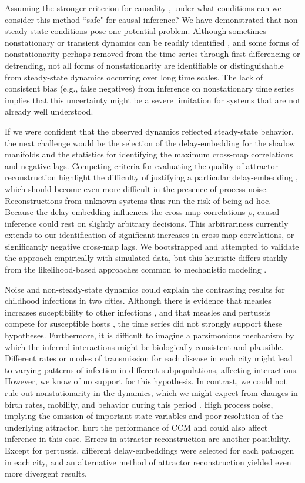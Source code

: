 \documentclass[10pt]{article}
\begin{document}
Assuming the stronger criterion for causality \cite{Ye2015}, under what conditions can we consider this method ``safe" for causal inference?
We have demonstrated that non-steady-state conditions pose one potential problem.
Although sometimes nonstationary or transient dynamics can be readily identified \cite{Ives2012}, and some forms of nonstationarity perhaps removed from the time series through first-differencing or detrending, not all forms of nonstationarity are identifiable or distinguishable from steady-state dynamics occurring over long time scales.
The lack of consistent bias (e.g., false negatives) from inference on nonstationary time series implies that this uncertainty might be a severe limitation for systems that are not already well understood.

If we were confident that the observed dynamics reflected steady-state behavior, the next challenge would be the selection of the delay-embedding for the shadow manifolds and the statistics for identifying the maximum cross-map correlations and negative lags.
Competing criteria for evaluating the quality of attractor reconstruction highlight the difficulty of justifying a particular delay-embedding \cite{Casdagli1991, Uzal2011, Nichkawde2013, Tajima2015, Sugihara1990}, which should become even more difficult in the presence of process noise.
Reconstructions from unknown systems thus run the risk of being ad hoc.
Because the delay-embedding influences the cross-map correlations $\rho$, causal inference could rest on slightly arbitrary decisions.   
This arbitrariness currently extends to our identification of significant increases in cross-map correlations, or significantly negative cross-map lags.
We bootstrapped and attempted to validate the approach empirically with simulated data, but this heuristic differs starkly from the likelihood-based approaches common to mechanistic modeling \cite{HilbornMangel}.

Noise and non-steady-state dynamics could explain the contrasting results for childhood infections in two cities. 
Although there is evidence that measles increases suceptibility to other infections \cite{Mina2015}, and that measles and pertussis compete for susceptible hosts \cite{Rohani2003}, the time series did not strongly support these hypotheses. 
Furthermore, it is difficult to imagine a parsimonious mechanism by which the inferred interactions might be biologically consistent and plausible.
Different rates or modes of transmission for each disease in each city might lead to varying patterns of infection in different subpopulations, affecting interactions.
However, we know of no support for this hypothesis.
In contrast, we could not rule out nonstationarity in the dynamics, which we might expect from changes in birth rates, mobility, and behavior during this period \cite{Earn2000}.
High process noise, implying the omission of important state variables and poor resolution of the underlying attractor, hurt the performance of CCM and could also affect inference in this case. 
Errors in attractor reconstruction are another possibility. 
Except for pertussis, different delay-embeddings were selected for each pathogen in each city, and an alternative method of attractor reconstruction yielded even more divergent results. 
\end{document}
